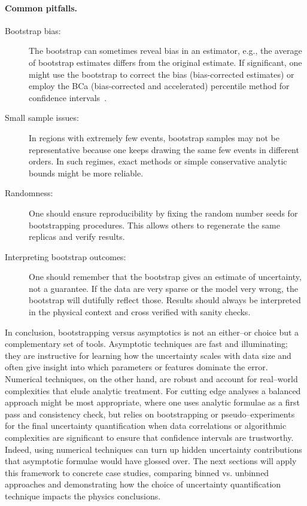         \paragraph{Common pitfalls.}
            \begin{description}
                \item [Bootstrap bias:]
                    The bootstrap can sometimes reveal bias in an estimator, e.g., the average of bootstrap estimates differs from the original estimate.
                    If significant, one might use the bootstrap to correct the bias (bias-corrected estimates) or employ the BCa (bias-corrected and accelerated) percentile method for confidence intervals~\cite{puth_variety_2015}.
                \item[Small sample issues:]
                    In regions with extremely few events, bootstrap samples may not be representative because one keeps drawing the same few events in different orders.
                    In such regimes, exact methods or simple conservative analytic bounds might be more reliable.
                \item[Randomness:]
                    One should ensure reproducibility by fixing the random number seeds for bootstrapping procedures.
                    This allows others to regenerate the same replicas and verify results.
                \item[Interpreting bootstrap outcomes:]
                    One should remember that the bootstrap gives an estimate of uncertainty, not a guarantee.
                    If the data are very sparse or the model very wrong, the bootstrap will dutifully reflect those.
                    Results should always be interpreted in the physical context and cross verified with sanity checks.
            \end{description}
            
    In conclusion, bootstrapping versus asymptotics is not an either--or choice but a complementary set of tools.
    Asymptotic techniques are fast and illuminating;
    they are instructive for learning how the uncertainty scales with data size and often give insight into which parameters or features dominate the error.
    Numerical techniques, on the other hand, are robust and account for real--world complexities that elude analytic treatment.
    For cutting edge analyses a balanced approach might be most appropriate, where one uses analytic formulae as a first pass and consistency check, but relies on bootstrapping or pseudo--experiments for the final uncertainty quantification when data correlations or algorithmic complexities are significant to ensure that confidence intervals are trustworthy.
    Indeed, using numerical techniques can turn up hidden uncertainty contributions that asymptotic formulae would have glossed over.
    The next sections will apply this framework to concrete case studies, comparing binned vs. unbinned approaches and demonstrating how the choice of uncertainty quantification technique impacts the physics conclusions.
    
